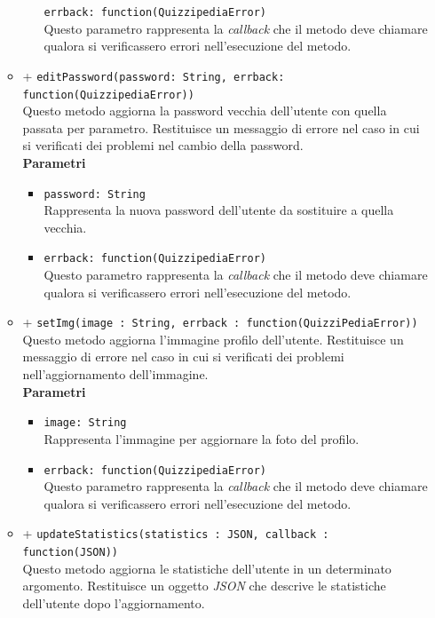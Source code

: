 \begin{itemize}
\begin{itemize}
\begin{itemize}
				\texttt{errback: function(QuizzipediaError)} \\
				Questo parametro rappresenta la \textit{callback} che il metodo deve chiamare qualora si verificassero errori nell'esecuzione del metodo.
			\end{itemize}	
		\item	
		+ \texttt{editPassword(password: String, errback: function(QuizzipediaError))} \\
		Questo metodo aggiorna la password vecchia dell'utente con quella passata per parametro. Restituisce un messaggio di errore nel caso in cui si verificati dei problemi nel cambio della password.	\\
		\textbf{Parametri} 
			\begin{itemize}
			\item
				\texttt{password: String} \\
				Rappresenta la nuova password dell'utente da sostituire a quella vecchia.
			\item	
				\texttt{errback: function(QuizzipediaError)} \\
				Questo parametro rappresenta la \textit{callback} che il metodo deve chiamare qualora si verificassero errori nell'esecuzione del metodo.
			\end{itemize}
		\item	
		+ \texttt{setImg(image : String, errback : function(QuizziPediaError))} \\	
		Questo metodo aggiorna l'immagine profilo dell'utente. Restituisce un messaggio di errore nel caso in cui si verificati dei problemi nell'aggiornamento dell'immagine.	\\	
		\textbf{Parametri} 
			\begin{itemize}
			\item
				\texttt{image: String} \\
				Rappresenta l'immagine per aggiornare la foto del profilo.
			\item	
				\texttt{errback: function(QuizzipediaError)} \\
				Questo parametro rappresenta la \textit{callback} che il metodo deve chiamare qualora si verificassero errori nell'esecuzione del metodo.
			\end{itemize}
		\item	
		+ \texttt{updateStatistics(statistics : JSON, callback : function(JSON))} \\	
		Questo metodo aggiorna le statistiche dell'utente in un determinato argomento. Restituisce un oggetto \textit{JSON} che descrive le statistiche dell'utente dopo l'aggiornamento.	\\	

\end{itemize}
\end{itemize}
